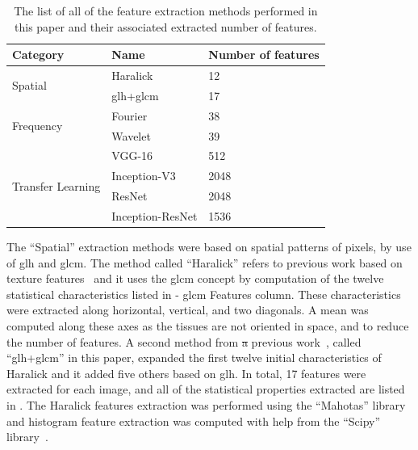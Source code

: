 \documentclass[journal,article,accept,moreauthors,pdftex, applsci]{Definitions/mdpi}
\providecommand{\DIFdel}[1]{{\protect\color{red}\sout{#1}}}                      %
\providecommand{\DIFdelbegin}{} %
\providecommand{\DIFdelend}{} %
\begin{document}
\begin{table}[H]
    \centering
    \begin{tabular}{lll}
    \hline
    \textbf{Category}                   &  \textbf{Name}                & \textbf{Number of features}  \\ \hline
    \multirow{2}{*}{Spatial}            &  Haralick                     & 12                        \\ \cline{2-3} 
                                        &  \ac{glh}+\ac{glcm}           & 17                        \\ \hline 
    \multirow{2}{*}{Frequency}          &  Fourier                      & 38                        \\ \cline{2-3} 
                                        &  Wavelet                      & 39                        \\ \hline
    \multirow{4}{*}{Transfer Learning}  &  VGG-16                       & 512                       \\ \cline{2-3} 
                                        &  Inception-V3                 & 2048                      \\ \cline{2-3} 
                                        &  ResNet                       & 2048                      \\ \cline{2-3} 
                                        &  Inception-ResNet             & 1536                      \\ \hline
    \end{tabular}
    \caption{The list of all of the feature extraction methods performed in this paper and their associated extracted number of features.}
    \label{tab:features_methods}
\end{table}\par
The “Spatial” extraction methods were based on spatial patterns of pixels, by use of \ac{glh} and \ac{glcm}. The method called “Haralick” refers to previous work based on texture features~\cite{Haralick1973} and it uses the \ac{glcm} concept by computation of the twelve statistical characteristics listed in  - \ac{glcm} Features column. These characteristics were extracted along horizontal, vertical, and two diagonals. A mean was computed along these axes as the tissues are not oriented in space, and to reduce the number of features. A second method from \DIFdelbegin \DIFdel{a }\DIFdelend previous work~\cite{Wiltgen2008}, called “\ac{glh}+\ac{glcm}” in this paper, expanded the first twelve initial characteristics of Haralick and it added five others based on \ac{glh}. In total, 17 features were extracted for each image, and all of the statistical properties extracted are listed in . The Haralick features extraction was performed using the “Mahotas” library~\cite{coelho2012mahotas} and histogram feature extraction was computed with help from the “Scipy” library~\cite{Jones2001}.\par
\end{document}
